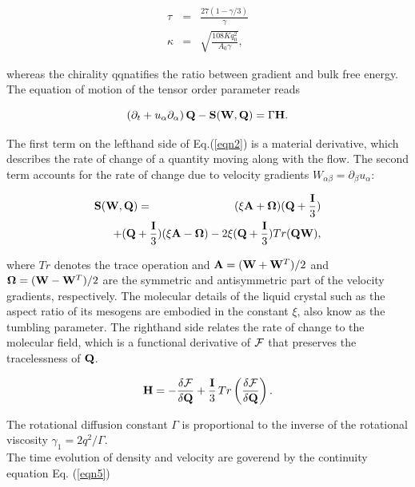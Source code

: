 \documentclass[aps,pre,twocolumn,groupedaddress]{revtex4-1}
\begin{document}
\begin{eqnarray}
\tau&=&\frac{27(1-\gamma/3)}{\gamma}\nonumber\\
\kappa&=&\sqrt{\frac{108 K q_0^2}{A_0 \gamma}}\nonumber,
\end{eqnarray}

whereas the chirality qqnatifies the ratio between gradient and bulk free energy.\\
The equation of motion of the tensor order parameter reads

\begin{equation}\label{}
\left(\partial_t+ u_\alpha \partial_\alpha \right){\bf Q} - {\bf S}({\bf W},{\bf Q}) = \Gamma {\bf H}.
\label{eqn2}
\end{equation}

The first term on the lefthand side of Eq.(\ref{eqn2}) is a material derivative, which describes the rate of change of a quantity moving along with the flow.
The second term accounts for the rate of change due to velocity gradients $W_{\alpha \beta}=\partial_\beta u_\alpha$:

\begin{eqnarray}
{\bf S}({\bf W}, {\bf Q}) &=& (\xi {\bf A} + {\boldsymbol \Omega})({\bf Q}+\frac{\bf I}{3})\nonumber\\
& &\hspace*{-1.5cm}+ ({\bf Q}+\frac{\bf I}{3})(\xi {\bf A}  - {\boldsymbol \Omega})-2 \xi ({\bf Q}+\frac{\bf I}{3})Tr({\bf Q W}),
\label{eqn3}
\end{eqnarray}

where $Tr$ denotes the trace operation and ${\bf A}=({\bf W}+{\bf W}^T)/2$ and ${\boldsymbol \Omega}=({\bf W}-{\bf W}^T)/2$ are the symmetric and antisymmetric part of the velocity gradients, respectively.
The molecular details of the liquid crystal such as the aspect ratio of its mesogens are embodied in the constant $\xi$, also know as the tumbling parameter.
The righthand side relates the rate of change to the molecular field, which is a functional derivative of $\cal F$ that preserves the tracelessness of $\bf Q$.

\begin{equation}
{\bf H}=-\frac{\delta {\cal F}}{\delta {\bf Q}}+\frac{\bf I}{3}\, Tr\left(\frac{\delta {\cal F}}{\delta {\bf Q}}\right).
\label{eqn4}
\end{equation}

The rotational diffusion constant $\Gamma$ is proportional to the inverse of the rotational viscosity $\gamma_1=2 q^2/\Gamma$.\\
The time evolution of density and velocity are goverend by the continuity equation Eq. (\ref{eqn5}) 
\end{document}
